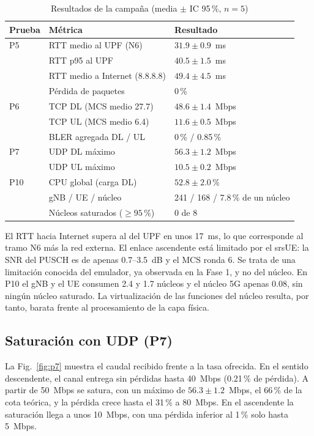 \documentclass[conference]{IEEEtran}
\begin{document}
\begin{table}[!t]
\caption{Resultados de la campaña (media $\pm$ IC 95\,\%, $n=5$)}
\label{tab:resultados}
\centering
\footnotesize
\renewcommand{\arraystretch}{1.12}
\begin{tabular}{p{1.0cm}p{3.6cm}p{2.9cm}}
\toprule
\textbf{Prueba} & \textbf{Métrica} & \textbf{Resultado} \\
\midrule
P5 & RTT medio al UPF (N6) & $31.9\pm0.9$~ms \\
   & RTT p95 al UPF & $40.5\pm1.5$~ms \\
   & RTT medio a Internet (8.8.8.8) & $49.4\pm4.5$~ms \\
   & Pérdida de paquetes & 0\,\% \\
P6 & TCP DL (MCS medio 27.7) & $48.6\pm1.4$~Mbps \\
   & TCP UL (MCS medio 6.4) & $11.6\pm0.5$~Mbps \\
   & BLER agregada DL / UL & 0\,\% / 0.85\,\% \\
P7 & UDP DL máximo & $56.3\pm1.2$~Mbps \\
   & UDP UL máximo & $10.5\pm0.2$~Mbps \\
P10 & CPU global (carga DL) & $52.8\pm2.0$\,\% \\
    & gNB / UE / núcleo & 241 / 168 / 7.8\,\% de un núcleo \\
    & Núcleos saturados ($\ge95$\,\%) & 0 de 8 \\
\bottomrule
\end{tabular}
\end{table}

El RTT hacia Internet supera al del UPF en unos 17~ms, lo que corresponde al tramo N6 más la red externa. El enlace ascendente está limitado por el srsUE: la SNR del PUSCH es de apenas 0.7--3.5~dB y el MCS ronda 6. Se trata de una limitación conocida del emulador, ya observada en la Fase 1, y no del núcleo. En P10 el gNB y el UE consumen 2.4 y 1.7 núcleos y el núcleo 5G apenas 0.08, sin ningún núcleo saturado. La virtualización de las funciones del núcleo resulta, por tanto, barata frente al procesamiento de la capa física.

\subsection{Saturación con UDP (P7)}
La Fig.~\ref{fig:p7} muestra el caudal recibido frente a la tasa ofrecida. En el sentido descendente, el canal entrega sin pérdidas hasta 40~Mbps (0.21\,\% de pérdida). A partir de 50~Mbps se satura, con un máximo de $56.3\pm1.2$~Mbps, el 66\,\% de la cota teórica, y la pérdida crece hasta el 31\,\% a 80~Mbps. En el ascendente la saturación llega a unos 10~Mbps, con una pérdida inferior al 1\,\% solo hasta 5~Mbps.
\end{document}
